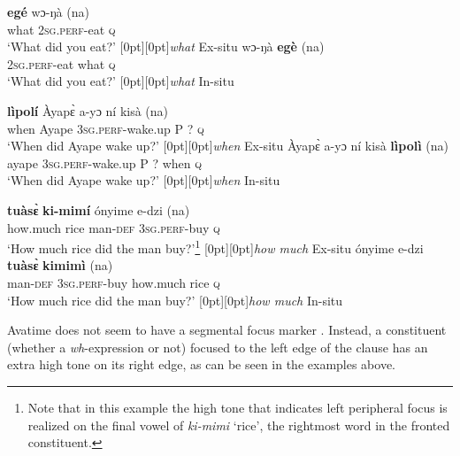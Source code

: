 \documentclass[output=paper]{langscibook}
\begin{document}
\ea \label{ex:devlin:what-basic}
\begin{xlist}
\ex 
\gll \textbf{eg\'{e}}  wɔ-ŋ\`{a} (na)\\
what \textsc{2sg}.\textsc{perf}-eat \textsc{q}\\
\glt `What did you eat?’ \hfill \raisebox{1.2\baselineskip}[0pt][0pt]{\textit{what} Ex-situ}
\ex
\gll wɔ-ŋ\`{a} \textbf{eg\`{e}}	(na)\\
\textsc{2sg}.\textsc{perf}-eat what \textsc{q}	\\
\glt `What did you eat?’ \hfill \raisebox{1.2\baselineskip}[0pt][0pt]{\textit{what} In-situ}
\end{xlist}
\ex\label{ex:devlin:when-basic}
\begin{xlist}
\ex
\gll \textbf{l\`{i}pol\'{i}} \`{A}yap\`{ɛ} a-yɔ n\'{i} kis\`{a} (na)\\
when Ayape  \textsc{3sg}.\textsc{perf}-wake.up P ? \textsc{q} \\
\glt `When did Ayape wake up?’
\hfill \raisebox{1.2\baselineskip}[0pt][0pt]{\textit{when} Ex-situ}
\ex
\gll \`{A}yap\`{ɛ} a-yɔ n\'{i} kis\`{a} \textbf{l\`{i}pol\`{i}} (na)\\
ayape \textsc{3sg}.\textsc{perf}-wake.up P ? when \textsc{q} \\
\glt `When did Ayape wake up?'
\hfill \raisebox{1.2\baselineskip}[0pt][0pt]{\textit{when} In-situ}
\end{xlist}
\ex \label{ex:devlin:howmuch-basic}
\begin{xlist}
\ex 
\gll \textbf{tu\`{a}s\`{ɛ}} \textbf{ki-mim\'{i}} \'{o}nyime e-dzi (na)  \\
how.much rice man-\textsc{def} \textsc{\textsc{3sg}}.\textsc{perf}-buy \textsc{q}\\
\glt `How much rice did the man buy?’\footnote{Note that in this example the high tone that indicates left peripheral focus is realized on the final vowel of \textit{ki-mimi} `rice', the rightmost word in the fronted constituent.} \hfill \raisebox{1.2\baselineskip}[0pt][0pt]{\textit{how much} Ex-situ}
\ex
\gll \'{o}nyime e-dzi \textbf{tu\`{a}s\`{ɛ}}  \textbf{kimim\`{i}} (na)\\
man-\textsc{def} \textsc{\textsc{3sg}}.\textsc{perf}-buy	how.much rice  \textsc{q} \\
\glt `How much rice did the man buy?’ \hfill \raisebox{1.2\baselineskip}[0pt][0pt]{\textit{how much} In-situ}
\end{xlist}
\z


Avatime does not seem to have a segmental focus marker \citep{ford:1971,van2014information}.  Instead, a constituent (whether a \textit{wh}-expression or not) focused to the left edge of the clause has an extra high tone on its right edge, as can be seen in the examples above. 
\end{document}
